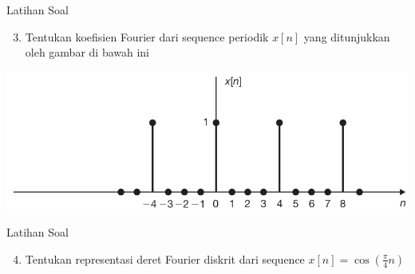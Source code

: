 \documentclass[pdflatex,compress,mathserif]{beamer}
\begin{document}
\begin{frame}{Latihan Soal}
	\begin{enumerate}
		\setcounter{enumi}{2}
		\item Tentukan koefisien Fourier dari sequence periodik $ x[n] $ yang ditunjukkan oleh gambar di bawah ini
	\end{enumerate}
	\begin{center}
		\includegraphics[width=\linewidth]{img/img03}
	\end{center}
\end{frame}

\begin{frame}{Latihan Soal}
	\begin{enumerate}
		\setcounter{enumi}{3}
		\item Tentukan representasi deret Fourier diskrit dari sequence $ x[n] = \cos(\frac{\pi}{4}n)$
	\end{enumerate}
\end{frame}
\end{document}
